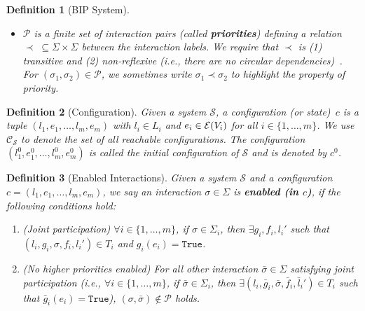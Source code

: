 \documentclass[10pt, a4paper, onecolumn, conference, compsocconf]{IEEEtran}
\newcommand{\true}{\texttt{True}}
\newcommand\boolform{{\cal B}}
\newcommand\eval{{\cal E}}
\newcommand{\initloc}[1]{l^0_{#1}}
\newcommand{\initeval}[1]{e^0_{#1}}
\newcommand{\initconf}{c^0}
\newcommand{\system}{\mathcal{S}}
\newcommand{\conf}{\mathcal{C}_{\system}\xspace}
\newtheorem{defi}{Definition}
\begin{document}
\begin{defi}[BIP System]
\begin{itemize}
\begin{itemize}
$\sigma \in \Sigma_i$ is an interaction label (specifying the event triggering the transition), and $f: V_i \to \boolform(V_i)$ is the \emph{update function} mapping every variable to a Boolean formula
encoding the change of its value.
  \item $\initloc{i} \in L_i$ is the \emph{initial location} and $\initeval{i} \in \eval(V_i)$ is the initial evaluation of the variables.
 \end{itemize}
 \item $\mathcal{P}$ is a finite set of interaction pairs (called \textbf{priorities}) defining a relation $\prec \; \subseteq\Sigma\times\Sigma$ between the interaction labels. We require that $\prec$ is (1)
    transitive and (2) non-reflexive (i.e., there are no circular
    dependencies)~\cite{goessler2003priority}. For $(\sigma_1, \sigma_2) \in \mathcal{P}$, we sometimes write $\sigma_1 \prec \sigma_2$ to highlight the property of priority.
\end{itemize}
\end{defi}


\begin{defi}[Configuration]
Given a system $\mathcal{S}$, a \emph{configuration (or state)}~$c$ is a tuple $(l_1, e_1, \ldots, l_m, e_m)$ with $l_i \in L_i$ and $e_i \in \eval(V_i)$ for all $i \in \{1,\ldots,m\}$. We use $\conf$ to denote the set of all reachable configurations.
The configuration $(\initloc{1}, \initeval{1}, \ldots, \initloc{m}, \initeval{m})$ is called the \emph{initial configuration} of $\mathcal{S}$ and
is denoted by $\initconf$. \end{defi}

\newcommand{\inter}{\bar{\sigma}}

\begin{defi}[Enabled Interactions]\label{def:semantics}
Given a system $\mathcal{S}$ and a configuration $c=(l_1, e_1, \ldots, l_m, e_m)$,
we say an interaction $\sigma \in \Sigma$ is \textbf{enabled (in $c$)}, if the following conditions hold:
\begin{enumerate}
    \item (Joint participation) $\forall i \in \{1,\ldots, m\}$, if $\sigma \in \Sigma_i$, then $\exists g_i, f_i, l_i'$ such that $(l_i,g_i,\sigma,f_i,l_i') \in T_i$ and  $g_i(e_i) = \true$.
    \item (No higher priorities enabled) For all other interaction $\inter \in \Sigma$ satisfying joint participation (i.e., $\forall i \in \{1,\ldots, m\}$, if $\inter \in \Sigma_i$, then $\exists (l_i,\bar{g}_i,\inter,\bar{f}_i,\bar{l}_i') \in T_i$ such that $\bar{g}_i(e_i) = \true$), $(\sigma, \inter) \not\in \mathcal{P}$ holds.

\end{enumerate}
\end{defi}
\end{document}
